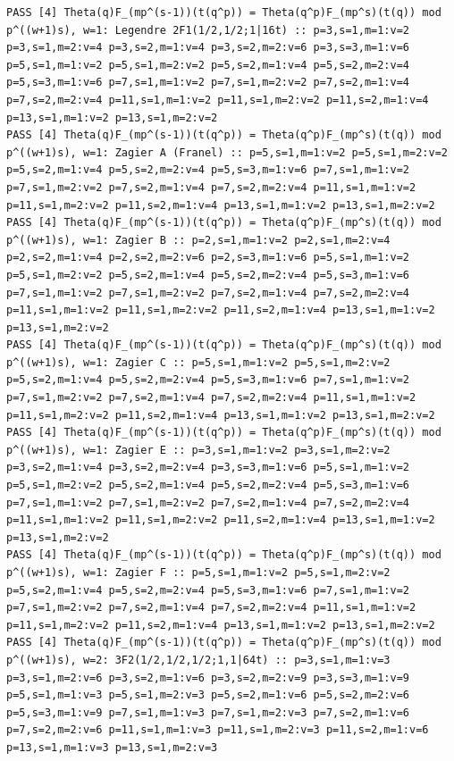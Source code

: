 \documentclass[11pt,a4paper]{article}
\theoremstyle{definition}\newtheorem{definition}[theorem]{Definition}
\theoremstyle{remark}\newtheorem{remark}[theorem]{Remark}
\numberwithin{equation}{section}
\begin{document}
\begin{lstlisting}
PASS [4] Theta(q)F_(mp^(s-1))(t(q^p)) = Theta(q^p)F_(mp^s)(t(q)) mod p^((w+1)s), w=1: Legendre 2F1(1/2,1/2;1|16t) :: p=3,s=1,m=1:v=2 p=3,s=1,m=2:v=4 p=3,s=2,m=1:v=4 p=3,s=2,m=2:v=6 p=3,s=3,m=1:v=6 p=5,s=1,m=1:v=2 p=5,s=1,m=2:v=2 p=5,s=2,m=1:v=4 p=5,s=2,m=2:v=4 p=5,s=3,m=1:v=6 p=7,s=1,m=1:v=2 p=7,s=1,m=2:v=2 p=7,s=2,m=1:v=4 p=7,s=2,m=2:v=4 p=11,s=1,m=1:v=2 p=11,s=1,m=2:v=2 p=11,s=2,m=1:v=4 p=13,s=1,m=1:v=2 p=13,s=1,m=2:v=2
PASS [4] Theta(q)F_(mp^(s-1))(t(q^p)) = Theta(q^p)F_(mp^s)(t(q)) mod p^((w+1)s), w=1: Zagier A (Franel) :: p=5,s=1,m=1:v=2 p=5,s=1,m=2:v=2 p=5,s=2,m=1:v=4 p=5,s=2,m=2:v=4 p=5,s=3,m=1:v=6 p=7,s=1,m=1:v=2 p=7,s=1,m=2:v=2 p=7,s=2,m=1:v=4 p=7,s=2,m=2:v=4 p=11,s=1,m=1:v=2 p=11,s=1,m=2:v=2 p=11,s=2,m=1:v=4 p=13,s=1,m=1:v=2 p=13,s=1,m=2:v=2
PASS [4] Theta(q)F_(mp^(s-1))(t(q^p)) = Theta(q^p)F_(mp^s)(t(q)) mod p^((w+1)s), w=1: Zagier B :: p=2,s=1,m=1:v=2 p=2,s=1,m=2:v=4 p=2,s=2,m=1:v=4 p=2,s=2,m=2:v=6 p=2,s=3,m=1:v=6 p=5,s=1,m=1:v=2 p=5,s=1,m=2:v=2 p=5,s=2,m=1:v=4 p=5,s=2,m=2:v=4 p=5,s=3,m=1:v=6 p=7,s=1,m=1:v=2 p=7,s=1,m=2:v=2 p=7,s=2,m=1:v=4 p=7,s=2,m=2:v=4 p=11,s=1,m=1:v=2 p=11,s=1,m=2:v=2 p=11,s=2,m=1:v=4 p=13,s=1,m=1:v=2 p=13,s=1,m=2:v=2
PASS [4] Theta(q)F_(mp^(s-1))(t(q^p)) = Theta(q^p)F_(mp^s)(t(q)) mod p^((w+1)s), w=1: Zagier C :: p=5,s=1,m=1:v=2 p=5,s=1,m=2:v=2 p=5,s=2,m=1:v=4 p=5,s=2,m=2:v=4 p=5,s=3,m=1:v=6 p=7,s=1,m=1:v=2 p=7,s=1,m=2:v=2 p=7,s=2,m=1:v=4 p=7,s=2,m=2:v=4 p=11,s=1,m=1:v=2 p=11,s=1,m=2:v=2 p=11,s=2,m=1:v=4 p=13,s=1,m=1:v=2 p=13,s=1,m=2:v=2
PASS [4] Theta(q)F_(mp^(s-1))(t(q^p)) = Theta(q^p)F_(mp^s)(t(q)) mod p^((w+1)s), w=1: Zagier E :: p=3,s=1,m=1:v=2 p=3,s=1,m=2:v=2 p=3,s=2,m=1:v=4 p=3,s=2,m=2:v=4 p=3,s=3,m=1:v=6 p=5,s=1,m=1:v=2 p=5,s=1,m=2:v=2 p=5,s=2,m=1:v=4 p=5,s=2,m=2:v=4 p=5,s=3,m=1:v=6 p=7,s=1,m=1:v=2 p=7,s=1,m=2:v=2 p=7,s=2,m=1:v=4 p=7,s=2,m=2:v=4 p=11,s=1,m=1:v=2 p=11,s=1,m=2:v=2 p=11,s=2,m=1:v=4 p=13,s=1,m=1:v=2 p=13,s=1,m=2:v=2
PASS [4] Theta(q)F_(mp^(s-1))(t(q^p)) = Theta(q^p)F_(mp^s)(t(q)) mod p^((w+1)s), w=1: Zagier F :: p=5,s=1,m=1:v=2 p=5,s=1,m=2:v=2 p=5,s=2,m=1:v=4 p=5,s=2,m=2:v=4 p=5,s=3,m=1:v=6 p=7,s=1,m=1:v=2 p=7,s=1,m=2:v=2 p=7,s=2,m=1:v=4 p=7,s=2,m=2:v=4 p=11,s=1,m=1:v=2 p=11,s=1,m=2:v=2 p=11,s=2,m=1:v=4 p=13,s=1,m=1:v=2 p=13,s=1,m=2:v=2
PASS [4] Theta(q)F_(mp^(s-1))(t(q^p)) = Theta(q^p)F_(mp^s)(t(q)) mod p^((w+1)s), w=2: 3F2(1/2,1/2,1/2;1,1|64t) :: p=3,s=1,m=1:v=3 p=3,s=1,m=2:v=6 p=3,s=2,m=1:v=6 p=3,s=2,m=2:v=9 p=3,s=3,m=1:v=9 p=5,s=1,m=1:v=3 p=5,s=1,m=2:v=3 p=5,s=2,m=1:v=6 p=5,s=2,m=2:v=6 p=5,s=3,m=1:v=9 p=7,s=1,m=1:v=3 p=7,s=1,m=2:v=3 p=7,s=2,m=1:v=6 p=7,s=2,m=2:v=6 p=11,s=1,m=1:v=3 p=11,s=1,m=2:v=3 p=11,s=2,m=1:v=6 p=13,s=1,m=1:v=3 p=13,s=1,m=2:v=3

\end{lstlisting}
\end{document}
